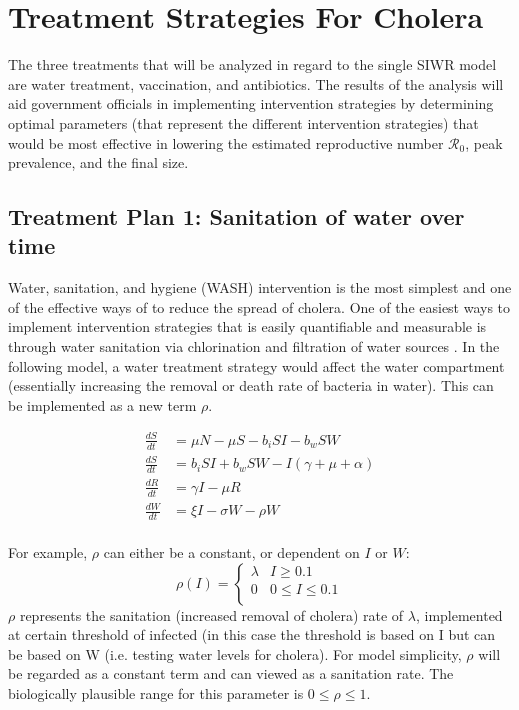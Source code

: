 \documentclass[12pt]{article}\usepackage[]{graphicx}\usepackage[]{color}
\begin{document}
\section{Treatment Strategies For Cholera}

The three treatments that will be analyzed in regard to the single SIWR model are water treatment, vaccination, and antibiotics.
The results of the analysis will aid government officials in implementing intervention strategies by determining optimal  parameters (that represent the different intervention strategies) that would be most effective in lowering the estimated reproductive number $\mathcal R_0$, peak prevalence, and the final size.
\subsection{Treatment Plan 1: Sanitation of water over time}
Water, sanitation, and hygiene (WASH) intervention is the most simplest and one of the effective ways of to reduce the spread of cholera.
One of the easiest ways to implement intervention strategies that is easily quantifiable and measurable is through water sanitation via chlorination and filtration of water sources \citep{link26}.
In the following model, a water treatment strategy would affect the water compartment (essentially increasing the removal or death rate of bacteria in water).
This can be implemented as a new term $\rho$. \par

\begin{linenomath}
\begin{align*}
	\frac{dS}{dt}&= \mu N - \mu S - b_i SI - b_w S W  \\
	\frac{dS}{dt}&= b_i S I + b_w S W - I (\gamma + \mu + \alpha) \\
	\frac{dR}{dt}&= \gamma I - \mu R \\
	\frac{dW}{dt}&= \xi I  - \sigma W - \rho W\\
\end{align*}
\end{linenomath}

For example, $\rho$ can either be a constant, or dependent on $I$ or $W$:\\
$$\rho (I)= \begin{cases}
			 			\lambda & I \geq 0.1 \\
			 			0 & 0 \leq I \leq 0.1 \\
			 			\end{cases}$$
$\rho$ represents the sanitation (increased removal of cholera) rate of $\lambda$, implemented at certain threshold of infected (in this case the threshold is based on I but can be based on W (i.e. testing water levels for cholera).
For model simplicity, $\rho$ will be regarded as a constant term and can viewed as a sanitation rate. The biologically plausible range for this parameter is $0 \leq \rho \leq 1$.\\
\end{document}
